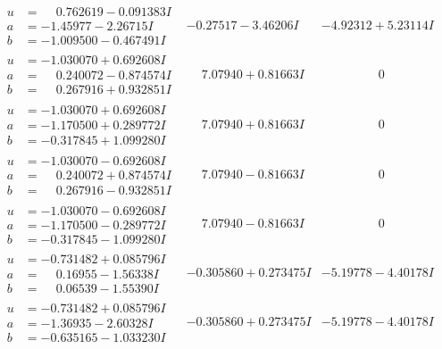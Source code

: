 \documentclass[1p]{elsarticle_modified}
\theoremstyle{definition}
\begin{document}
$$\begin{array}{c|c|c}
\begin{aligned}
u &= \phantom{-}0.762619 - 0.091383 I \\
a &= -1.45977 - 2.26715 I \\
b &= -1.009500 - 0.467491 I\end{aligned}
 & -0.27517 - 3.46206 I & -4.92312 + 5.23114 I \\ \hline\begin{aligned}
u &= -1.030070 + 0.692608 I \\
a &= \phantom{-}0.240072 - 0.874574 I \\
b &= \phantom{-}0.267916 + 0.932851 I\end{aligned}
 & \phantom{-}7.07940 + 0.81663 I & \phantom{-0.000000 } 0 \\ \hline\begin{aligned}
u &= -1.030070 + 0.692608 I \\
a &= -1.170500 + 0.289772 I \\
b &= -0.317845 + 1.099280 I\end{aligned}
 & \phantom{-}7.07940 + 0.81663 I & \phantom{-0.000000 } 0 \\ \hline\begin{aligned}
u &= -1.030070 - 0.692608 I \\
a &= \phantom{-}0.240072 + 0.874574 I \\
b &= \phantom{-}0.267916 - 0.932851 I\end{aligned}
 & \phantom{-}7.07940 - 0.81663 I & \phantom{-0.000000 } 0 \\ \hline\begin{aligned}
u &= -1.030070 - 0.692608 I \\
a &= -1.170500 - 0.289772 I \\
b &= -0.317845 - 1.099280 I\end{aligned}
 & \phantom{-}7.07940 - 0.81663 I & \phantom{-0.000000 } 0 \\ \hline\begin{aligned}
u &= -0.731482 + 0.085796 I \\
a &= \phantom{-}0.16955 - 1.56338 I \\
b &= \phantom{-}0.06539 - 1.55390 I\end{aligned}
 & -0.305860 + 0.273475 I & -5.19778 - 4.40178 I \\ \hline\begin{aligned}
u &= -0.731482 + 0.085796 I \\
a &= -1.36935 - 2.60328 I \\
b &= -0.635165 - 1.033230 I\end{aligned}
 & -0.305860 + 0.273475 I & -5.19778 - 4.40178 I\\

\end{array}$$
\end{document}
